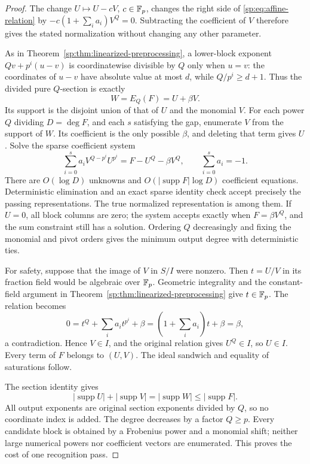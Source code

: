\begin{proof}
The change $U\mapsto U-cV$, $c\in\mathbb F_p$, changes the right side of
\eqref{sp:eq:affine-relation} by
$-c(1+\sum_i a_i)V^Q=0$. Subtracting the coefficient of $V$ therefore
gives the stated normalization without changing any other parameter.

As in Theorem~\ref{sp:thm:linearized-preprocessing}, a lower-block
exponent $Qv+p^i(u-v)$ is coordinatewise divisible by $Q$ only when
$u=v$: the coordinates of $u-v$ have absolute value at most $d$, while
$Q/p^i\ge d+1$. Thus the divided pure $Q$-section is exactly
\[
 W=E_Q(F)=U+\beta V.
\]
Its support is the disjoint union of that of $U$ and the monomial $V$.
For each power $Q$ dividing $D=\deg F$, and each $s$ satisfying the
gap, enumerate $V$ from the support of $W$. Its coefficient is the
only possible $\beta$, and deleting that term gives $U$. Solve the
sparse coefficient system
\[
 \sum_{i=0}^s a_i V^{Q-p^i}U^{p^i}
       =F-U^Q-\beta V^Q,
 \qquad \sum_{i=0}^s a_i=-1.
\]
There are $O(\log D)$ unknowns and $O(|\operatorname{supp}F|\log D)$
coefficient equations. Deterministic elimination and an exact sparse
identity check accept precisely the passing representations. The
true normalized representation is among them. If $U=0$, all block
columns are zero; the system accepts exactly when $F=\beta V^Q$,
and the sum constraint still has a solution. Ordering $Q$
decreasingly and fixing the monomial and pivot orders gives the
minimum output degree with deterministic ties.

For safety, suppose that the image of $V$ in $S/I$ were nonzero.
Then $t=U/V$ in its fraction field would be algebraic over $\mathbb F_p$.
Geometric integrality and the constant-field argument in
Theorem~\ref{sp:thm:linearized-preprocessing} give $t\in\mathbb F_p$.
The relation becomes
\[
 0=t^Q+\sum_i a_it^{p^i}+\beta
   =\left(1+\sum_i a_i\right)t+\beta=\beta,
\]
a contradiction. Hence $V\in I$, and the original relation gives
$U^Q\in I$, so $U\in I$. Every term of $F$ belongs to $(U,V)$.
The ideal sandwich and equality of saturations follow.

The section identity gives
\[
 |\operatorname{supp}U|+|\operatorname{supp}V|
   =|\operatorname{supp}W|\le|\operatorname{supp}F|.
\]
All output exponents are original section exponents divided by $Q$,
so no coordinate index is added. The degree decreases by a factor
$Q\ge p$. Every candidate block is obtained by a Frobenius power and
a monomial shift; neither large numerical powers nor coefficient
vectors are enumerated. This proves the cost of one recognition pass.


\end{proof}
